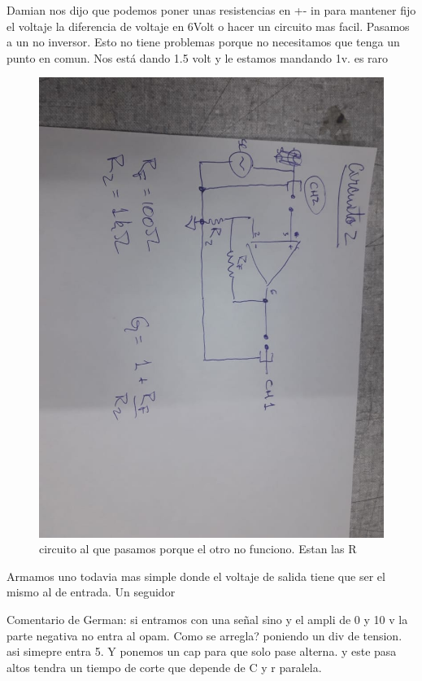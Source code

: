 \documentclass[a4paper,12pt]{article}
\begin{document}
Damian nos dijo que podemos poner unas resistencias en +- in para mantener fijo el voltaje la diferencia de voltaje en 6Volt o hacer un circuito mas facil. Pasamos a un no inversor. Esto no tiene problemas porque no necesitamos que tenga un punto en comun.  Nos está dando 1.5 volt y le estamos mandando 1v. es raro 

\begin{figure}[H]
\centering
     \includegraphics[scale=0.40]{CircuitoNoInversor.jpeg}
     \caption{circuito al que pasamos porque el otro no funciono. Estan las R}
     \label{cir2}
\end{figure}

Armamos uno todavia mas simple donde el voltaje de salida tiene que ser el mismo al de entrada. Un seguidor

Comentario de German: si entramos con una señal sino y el ampli de 0 y 10 v la parte negativa no entra al opam. Como se arregla? poniendo un div de tension. asi simepre entra 5. Y ponemos un cap para que solo pase alterna. 
y este pasa altos tendra un tiempo de corte que depende de C y r paralela. 
\end{document}

